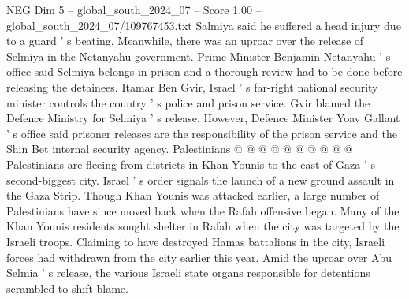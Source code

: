 \begin{textsample}{NEG Dim 5 – global\_south\_2024\_07 – Score 1.00 – global\_south\_2024\_07/109767453.txt}
Salmiya said he suffered a head injury due to a guard ' s beating.
Meanwhile, there was an uproar over the release of Selmiya in the Netanyahu government.
Prime Minister Benjamin Netanyahu ' s office said Selmiya belongs in prison and a thorough review had to be done before releasing the detainees.
Itamar Ben Gvir, Israel ' s far-right national security minister controls the country ' s police and prison service.
Gvir blamed the Defence Ministry for Selmiya ' s release.
However, Defence Minister Yoav Gallant ' s office said prisoner releases are the responsibility of the prison service and the Shin Bet internal security agency.
Palestinians @ @ @ @ @ @ @ @ @ @ Palestinians are fleeing from districts in Khan Younis to the east of Gaza ' s second-biggest city.
Israel ' s order signals the launch of a new ground assault in the Gaza Strip.
Though Khan Younis was attacked earlier, a large number of Palestinians have since moved back when the Rafah offensive began.
Many of the Khan Younis residents sought shelter in Rafah when the city was targeted by the Israeli troops.
Claiming to have destroyed Hamas battalions in the city, Israeli forces had withdrawn from the city earlier this year.
Amid the uproar over Abu Selmia ' s release, the various Israeli state organs responsible for detentions scrambled to shift blame.

\end{textsample}
